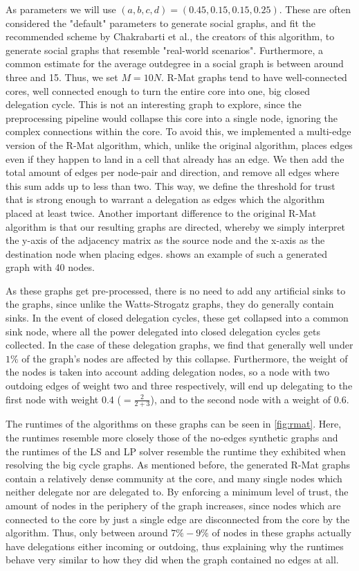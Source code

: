 As parameters we will use $(a, b, c, d) = (0.45, 0.15, 0.15, 0.25)$. These are often considered the "default" parameters to generate social graphs, and fit the recommended scheme by Chakrabarti et al., the creators of this algorithm, to generate social graphs that resemble "real-world scenarios". \cite{chakrabartiRMATRecursiveModel2004, zhouKanonymityLdiversityApproaches2011} Furthermore, a common estimate for the average outdegree in a social graph is between around three and 15. Thus, we set $M = 10 N$. R-Mat graphs tend to have well-connected cores, well connected enough to turn the entire core into one, big closed delegation cycle. This is not an interesting graph to explore, since the preprocessing pipeline would collapse this core into a single node, ignoring the complex connections within the core. To avoid this, we implemented a multi-edge version of the R-Mat algorithm, which, unlike the original algorithm, places edges even if they happen to land in a cell that already has an edge. We then add the total amount of edges per node-pair and direction, and remove all edges where this sum adds up to less than two. This way, we define the threshold for trust that is strong enough to warrant a delegation as edges which the algorithm placed at least twice. Another important difference to the original R-Mat algorithm is that our resulting graphs are directed, whereby we simply interpret the y-axis of the adjacency matrix as the source node and the x-axis as the destination node when placing edges.  shows an example of such a generated graph with 40 nodes.

As these graphs get pre-processed, there is no need to add any artificial sinks to the graphs, since unlike the Watts-Strogatz graphs, they do generally contain sinks. In the event of closed delegation cycles, these get collapsed into a common sink node, where all the power delegated into closed delegation cycles gets collected. In the case of these delegation graphs, we find that generally well under $1\%$ of the graph's nodes are affected by this collapse. Furthermore, the weight of the nodes is taken into account adding delegation nodes, so a node with two outdoing edges of weight two and three respectively, will end up delegating to the first node with weight 0.4 ($= \frac{2}{2+3}$), and to the second node with a weight of 0.6.

The runtimes of the algorithms on these graphs can be seen in \cref{fig:rmat}. Here, the runtimes resemble more closely those of the no-edges synthetic graphs and the runtimes of the LS and LP solver resemble the runtime they exhibited when resolving the big cycle graphs. As mentioned before, the generated R-Mat graphs contain a relatively dense community at the core, and many single nodes which neither delegate nor are delegated to. By enforcing a minimum level of trust, the amount of nodes in the periphery of the graph increases, since nodes which are connected to the core by just a single edge are disconnected from the core by the algorithm. Thus, only between around $7\% - 9\%$ of nodes in these graphs actually have delegations either incoming or outdoing, thus explaining why the runtimes behave very similar to how they did when the graph contained no edges at all.

